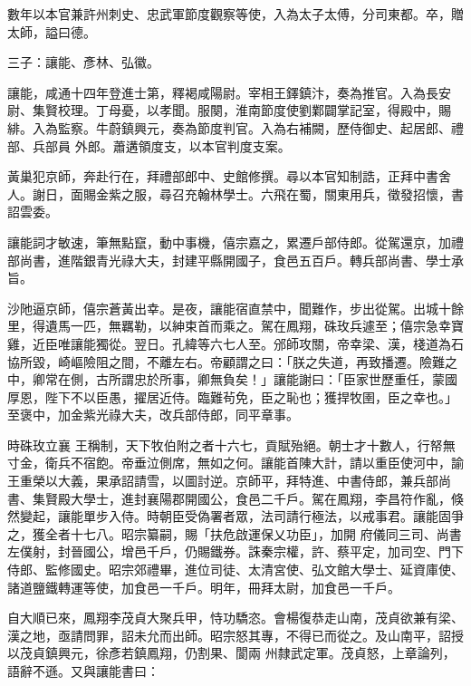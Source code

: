 \begin{pinyinscope}
 數年以本官兼許州刺史、忠武軍節度觀察等使，入為太子太傅，分司東都。卒，贈太師，謚曰德。



 三子：讓能、彥林、弘徽。



 讓能，咸通十四年登進士第，釋褐咸陽尉。宰相王鐸鎮汴，奏為推官。入為長安尉、集賢校理。丁母憂，以孝聞。服闋，淮南節度使劉鄴闢掌記室，得殿中，賜緋。入為監察。牛蔚鎮興元，奏為節度判官。入為右補闕，歷侍御史、起居郎、禮部、兵部員
 外郎。蕭遘領度支，以本官判度支案。



 黃巢犯京師，奔赴行在，拜禮部郎中、史館修撰。尋以本官知制誥，正拜中書舍人。謝日，面賜金紫之服，尋召充翰林學士。六飛在蜀，關東用兵，徵發招懷，書詔雲委。



 讓能詞才敏速，筆無點竄，動中事機，僖宗嘉之，累遷戶部侍郎。從駕還京，加禮部尚書，進階銀青光祿大夫，封建平縣開國子，食邑五百戶。轉兵部尚書、學士承旨。



 沙阤逼京師，僖宗蒼黃出幸。是夜，讓能宿直禁中，聞難作，步出從駕。出城十餘
 里，得遺馬一匹，無羈勒，以紳束首而乘之。駕在鳳翔，硃玫兵遽至；僖宗急幸寶雞，近臣唯讓能獨從。翌日。孔緯等六七人至。邠師攻關，帝幸梁、漢，棧道為石協所毀，崎嶇險阻之間，不離左右。帝顧謂之曰：「朕之失道，再致播遷。險難之中，卿常在側，古所謂忠於所事，卿無負矣！」讓能謝曰：「臣家世歷重任，蒙國厚恩，陛下不以臣愚，擢居近侍。臨難茍免，臣之恥也；獲捍牧圉，臣之幸也。」至褒中，加金紫光祿大夫，改兵部侍郎，同平章事。



 時硃玫立襄
 王稱制，天下牧伯附之者十六七，貢賦殆絕。朝士才十數人，行帑無寸金，衛兵不宿飽。帝垂泣側席，無如之何。讓能首陳大計，請以重臣使河中，諭王重榮以大義，果承詔請雪，以圖討逆。京師平，拜特進、中書侍郎，兼兵部尚書、集賢殿大學士，進封襄陽郡開國公，食邑二千戶。駕在鳳翔，李昌符作亂，倏然變起，讓能單步入侍。時朝臣受偽署者眾，法司請行極法，以戒事君。讓能固爭之，獲全者十七八。昭宗纂嗣，賜「扶危啟運保乂功臣」，加開
 府儀同三司、尚書左僕射，封晉國公，增邑千戶，仍賜鐵券。誅秦宗權，許、蔡平定，加司空、門下侍郎、監修國史。昭宗郊禮畢，進位司徒、太清宮使、弘文館大學士、延資庫使、諸道鹽鐵轉運等使，加食邑一千戶。明年，冊拜太尉，加食邑一千戶。



 自大順已來，鳳翔李茂貞大聚兵甲，恃功驕恣。會楊復恭走山南，茂貞欲兼有梁、漢之地，亟請問罪，詔未允而出師。昭宗怒其專，不得已而從之。及山南平，詔授以茂貞鎮興元，徐彥若鎮鳳翔，仍割果、閬兩
 州隸武定軍。茂貞怒，上章論列，語辭不遜。又與讓能書曰：




\end{pinyinscope}
